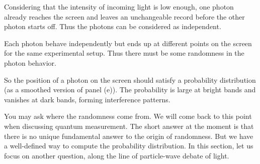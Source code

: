 {    Considering that the intensity of incoming light is low enough, one photon already reaches the screen and leaves an unchangeable record before the other photon starts off. Thus the photons can be considered as independent.
    
    Each photon behave independently but ends up at different points on the screen for the same experimental setup. Thus there must be some randomness in the photon behavior.

    So the position of a photon on the screen should satisfy a probability distribution (as a smoothed version of panel (e)). The probability is large at bright bands and vanishes at dark bands, forming interference patterns.
}

You may ask where the randomness come from. We will come back to this point when discussing quantum measurement. The short answer at the moment is that there is no unique fundamental answer to the origin of randomness. But we have a well-defined way to compute the probability distribution. In this section, let us focus on another question, along the line of particle-wave debate of light.

